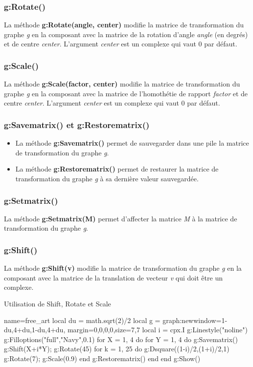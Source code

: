 \subsubsection{g:Rotate()}
La méthode \textbf{g:Rotate(angle, center)} modifie la matrice de transformation du graphe \emph g en la composant avec la matrice de la rotation d'angle \emph{angle} (en degrés) et de centre \emph{center}. L'argument \emph{center} est un complexe qui vaut $0$ par défaut.

\subsubsection{g:Scale()}
La méthode \textbf{g:Scale(factor, center)} modifie la matrice de transformation du graphe \emph g en la composant avec la matrice de l'homothétie de rapport \emph{factor} et de centre \emph{center}. L'argument \emph{center} est un complexe qui vaut $0$ par défaut.

\subsubsection{g:Savematrix() et g:Restorematrix()}
\begin{itemize}
    \item La méthode \textbf{g:Savematrix()} permet de sauvegarder dans une pile la matrice de transformation du graphe \emph g.
    \item La méthode \textbf{g:Restorematrix()} permet de restaurer la matrice de transformation du graphe \emph g à sa dernière valeur sauvegardée.
\end{itemize}

\subsubsection{g:Setmatrix()}
La méthode \textbf{g:Setmatrix(M)} permet d'affecter la matrice \emph M à la matrice de transformation du graphe \emph g.

\subsubsection{g:Shift()}
La méthode \textbf{g:Shift(v)} modifie la matrice de transformation du graphe \emph g en la composant avec la matrice de la translation de vecteur \emph{v} qui doit être un complexe.

\begin{demo}{Utilisation de Shift, Rotate et Scale}
\begin{luadraw}{name=free_art}
local du = math.sqrt(2)/2
local g = graph:new{window={1-du,4+du,1-du,4+du},
            margin={0,0,0,0},size={7,7}}
local i = cpx.I
g:Linestyle("noline")
g:Filloptions("full","Navy",0.1)
for X = 1, 4 do
    for Y = 1, 4 do
        g:Savematrix()
        g:Shift(X+i*Y); g:Rotate(45)
        for k = 1, 25 do
            g:Dsquare((1-i)/2,(1+i)/2,1)
            g:Rotate(7); g:Scale(0.9)
        end
        g:Restorematrix()
    end
end
g:Show()
\end{luadraw}
\end{demo}

